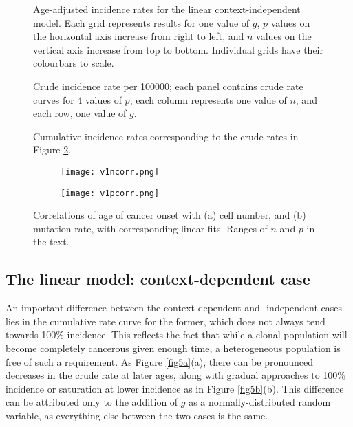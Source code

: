 \documentclass[12pt, onecolumn]{article}
\begin{document}
	\begin{figure}
		\centering
		\def\svgwidth{\columnwidth}
 	 	 
		\caption{\label{fig2} Age-adjusted incidence rates for the linear context-independent model. Each grid represents results for one value of $g$, $p$ values on the horizontal axis increase from right to left, and $n$ values on the vertical axis increase from top to bottom. Individual grids have their colourbars to scale.}
	\end{figure}
	
	\begin{figure}
		\ContinuedFloat*
		\centering
		\def\svgwidth{\columnwidth}
		
		\caption{\label{fig3a} Crude incidence rate per 100000; each panel contains crude rate curves for 4 values of $p$, each column represents one value of $n$, and each row, one value of $g$.}
	\end{figure}
	\begin{figure}
		\ContinuedFloat
		\centering
		\def\svgwidth{\columnwidth}
		
		\caption{\label{fig3b} Cumulative incidence rates corresponding to the crude rates in Figure \ref{fig3a}.}
	\end{figure}

	\begin{figure}
		\centering
		\begin{subfigure}[b]{0.45\textwidth}
			\texttt{[image: v1ncorr.png]}
			\caption{\empty}
			\label{fig4a}
		\end{subfigure}
		\begin{subfigure}[b]{0.45\textwidth}
			\texttt{[image: v1pcorr.png]}
			\caption{\empty}
			\label{fig4b}
		\end{subfigure}
		\caption{\label{fig4}Correlations of age of cancer onset with (a) cell number, and (b) mutation rate, with corresponding linear fits. Ranges of $n$ and $p$ in the text.}
	\end{figure}
	
	\subsection{The linear model: context-dependent case}
	An important difference between the context-dependent and -independent cases lies in the cumulative rate curve for the former, which does not always tend towards 100\% incidence. This reflects the fact that while a clonal population will become completely cancerous given enough time, a heterogeneous population is free of such a requirement. As Figure \ref{fig5a}(a), there can be pronounced decreases in the crude rate at later ages, along with gradual approaches to 100\% incidence or saturation at lower incidence as in Figure \ref{fig5b}(b). This difference can be attributed only to the addition of $g$ as a normally-distributed random variable, as everything else between the two cases is the same.
	
\end{document}
